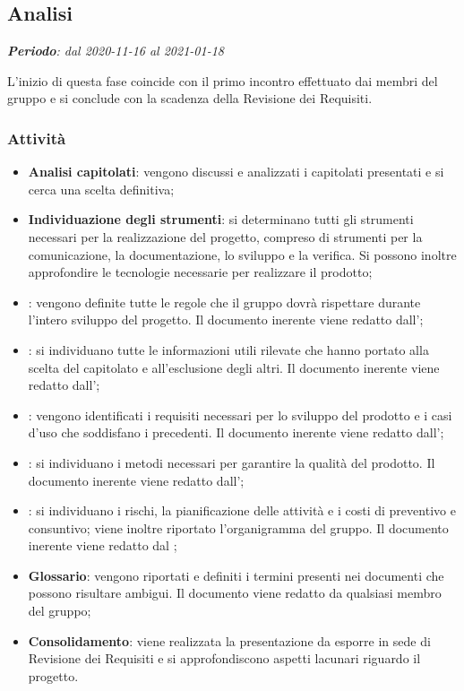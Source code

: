 \subsection{Analisi}

\textit{\textbf{Periodo}: dal 2020-11-16 al 2021-01-18}

L'inizio di questa fase coincide con il primo incontro effettuato dai membri del gruppo e si conclude con la scadenza della Revisione dei Requisiti.

\subsubsection{Attività}

\begin{itemize}
\item \textbf{Analisi capitolati}: vengono discussi e analizzati i capitolati presentati e si cerca una scelta definitiva;
\item \textbf{Individuazione degli strumenti}: si determinano tutti gli strumenti necessari per la realizzazione del progetto, compreso di strumenti per la comunicazione, la documentazione, lo sviluppo e la verifica. Si possono inoltre approfondire le tecnologie necessarie per realizzare il prodotto;
\item \textbf{\NdP{}}: vengono definite tutte le regole che il gruppo dovrà rispettare durante l'intero sviluppo del progetto. Il documento inerente viene redatto dall'\ammProg{};
\item \textbf{\SdF{}}: si individuano tutte le informazioni utili rilevate che hanno portato alla scelta del capitolato e all'esclusione degli altri. Il documento inerente viene redatto dall'\analProg{};
\item \textbf{\AdR{}}: vengono identificati i requisiti necessari per lo sviluppo del prodotto e i casi d'uso che soddisfano i precedenti. Il documento inerente viene redatto dall'\analProg{};
\item \textbf{\PdQ{}}: si individuano i metodi necessari per garantire la qualità del prodotto. Il documento inerente viene redatto dall'\ammProg{};
\item \textbf{\PdP{}}: si individuano i rischi, la pianificazione delle attività e i costi di preventivo e consuntivo; viene inoltre riportato l'organigramma del gruppo. Il documento inerente viene redatto dal \respProg{};
\item \textbf{Glossario}: vengono riportati e definiti i termini presenti nei documenti che possono risultare ambigui. Il documento viene redatto da qualsiasi membro del gruppo;
\item \textbf{Consolidamento}: viene realizzata la presentazione da esporre in sede di Revisione dei Requisiti e si approfondiscono aspetti lacunari riguardo il progetto.
\end{itemize}

